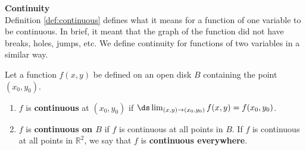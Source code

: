 \noindent\textbf{\large Continuity}\\

Definition \ref{def:continuous} defines what it means for a function of one variable to be continuous. In brief, it meant that the graph of the function did not have breaks, holes, jumps, etc. We define continuity for functions of two variables in a similar way.

{Let a function $f(x,y)$ be defined on an open disk $B$ containing the point $(x_0,y_0)$. 

\begin{enumerate}
	\item $f$ is \textbf{continuous} at $(x_0,y_0)$ if $\ds\lim_{(x,y)\to(x_0,y_0)} f(x,y) = f(x_0,y_0)$.
	\item	$f$ is \textbf{continuous on $B$} if $f$ is continuous at all points in $B$. If $f$ is continuous at all points in $\mathbb{R}^2$, we say that $f$ is \textbf{continuous everywhere}.
\end{enumerate}
}

